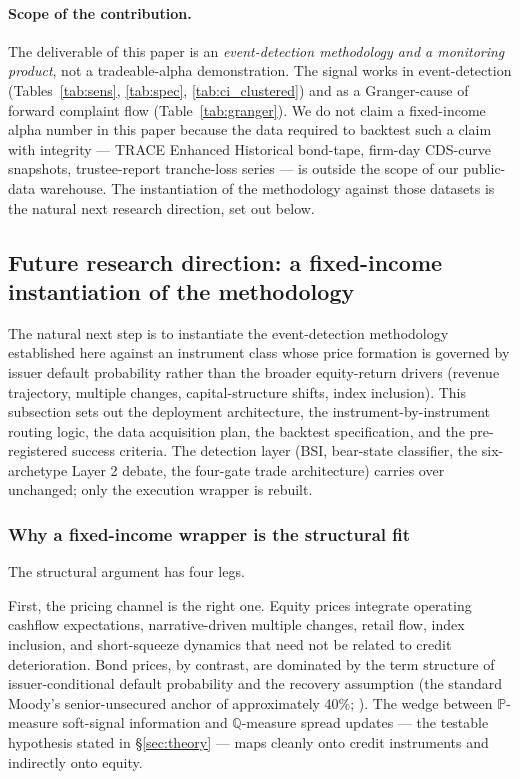 \documentclass[11pt,a4paper]{article}
\begin{document}
\paragraph{Scope of the contribution.} The deliverable of this paper is an \emph{event-detection methodology and a monitoring product}, not a tradeable-alpha demonstration. The signal works in event-detection (Tables~\ref{tab:sens}, \ref{tab:spec}, \ref{tab:ci_clustered}) and as a Granger-cause of forward complaint flow (Table~\ref{tab:granger}). We do not claim a fixed-income alpha number in this paper because the data required to backtest such a claim with integrity --- TRACE Enhanced Historical bond-tape, firm-day CDS-curve snapshots, trustee-report tranche-loss series --- is outside the scope of our public-data warehouse. The instantiation of the methodology against those datasets is the natural next research direction, set out below.

\subsection{Future research direction: a fixed-income instantiation of the methodology}\label{sec:future}

The natural next step is to instantiate the event-detection methodology established here against an instrument class whose price formation is governed by issuer default probability rather than the broader equity-return drivers (revenue trajectory, multiple changes, capital-structure shifts, index inclusion). This subsection sets out the deployment architecture, the instrument-by-instrument routing logic, the data acquisition plan, the backtest specification, and the pre-registered success criteria. The detection layer (BSI, bear-state classifier, the six-archetype Layer 2 debate, the four-gate trade architecture) carries over unchanged; only the execution wrapper is rebuilt.

\subsubsection{Why a fixed-income wrapper is the structural fit}

The structural argument has four legs.

First, the pricing channel is the right one. Equity prices integrate operating cashflow expectations, narrative-driven multiple changes, retail flow, index inclusion, and short-squeeze dynamics that need not be related to credit deterioration. Bond prices, by contrast, are dominated by the term structure of issuer-conditional default probability and the recovery assumption (the standard Moody's senior-unsecured anchor of approximately 40\%; \citealp{moodys2024recovery}). The wedge between $\mathbb{P}$-measure soft-signal information and $\mathbb{Q}$-measure spread updates --- the testable hypothesis stated in §\ref{sec:theory} --- maps cleanly onto credit instruments and indirectly onto equity.
\end{document}
